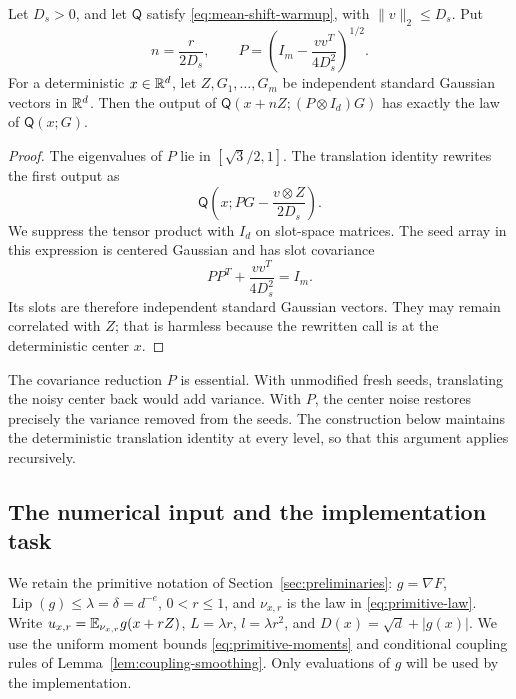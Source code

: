 \begin{lemma}
\label{lem:compiler-absorption}
Let $D_s>0$, and let $\mathsf Q$ satisfy
\eqref{eq:mean-shift-warmup}, with $\|v\|_2\le D_s$.  Put
\[
 n=\frac r{2D_s},\qquad
 P=\left(I_m-\frac{vv^T}{4D_s^2}\right)^{1/2}.
\]
For a deterministic $x\in\mathbb R^d$, let $Z,G_1,\ldots,G_m$ be independent
standard Gaussian vectors in $\mathbb R^d$.  Then the output of
$\mathsf Q(x+nZ;(P\otimes I_d)G)$ has exactly the law of
$\mathsf Q(x;G)$.
\end{lemma}
\begin{proof}
The eigenvalues of $P$ lie in $[\sqrt3/2,1]$.  The translation identity
rewrites the first output as
\[
 \mathsf Q\left(x;PG-\frac{v\otimes Z}{2D_s}\right).
\]
We suppress the tensor product with $I_d$ on slot-space matrices.
The seed array in this expression is centered Gaussian and has slot
covariance
\[
 PP^T+\frac{vv^T}{4D_s^2}=I_m.
\]
Its slots are therefore independent standard Gaussian vectors.  They
may remain correlated with $Z$; that is harmless because the rewritten
call is at the deterministic center $x$.
\end{proof}

The covariance reduction $P$ is essential.  With unmodified fresh
seeds, translating the noisy center back would add variance.  With
$P$, the center noise restores precisely the variance removed from the
seeds.  The construction below maintains the deterministic translation
identity at every level, so that this argument applies recursively.

\subsection{The numerical input and the implementation task}

We retain the primitive notation of Section~\ref{sec:preliminaries}:
$g=\nabla F$, $\operatorname{Lip}(g)\le\lambda=\delta=d^{-e}$,
$0<r\le1$, and $\nu_{x,r}$ is the law in
\eqref{eq:primitive-law}.  Write $u_{x,r}=\mathbb E_{\nu_{x,r}}g(x+rZ)$,
$L=\lambda r$, $l=\lambda r^2$, and $D(x)=\sqrt d+|g(x)|$.
We use the uniform moment bounds \eqref{eq:primitive-moments} and
conditional coupling rules of Lemma~\ref{lem:coupling-smoothing}.
Only evaluations of $g$ will be used by the implementation.


